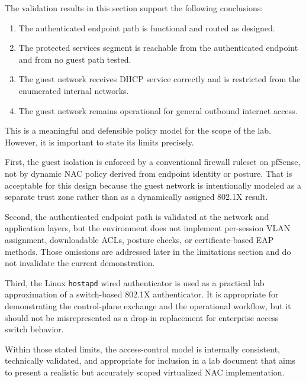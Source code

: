 \documentclass[11pt]{article}
\begin{document}
The validation results in this section support the following conclusions:

\begin{enumerate}
    \item The authenticated endpoint path is functional and routed as designed.
    \item The protected services segment is reachable from the authenticated endpoint and from no guest path tested.
    \item The guest network receives DHCP service correctly and is restricted from the enumerated internal networks.
    \item The guest network remains operational for general outbound internet access.
\end{enumerate}

This is a meaningful and defensible policy model for the scope of the lab. However, it is important to state its limits precisely.

First, the guest isolation is enforced by a conventional firewall ruleset on pfSense, not by dynamic NAC policy derived from endpoint identity or posture. That is acceptable for this design because the guest network is intentionally modeled as a separate trust zone rather than as a dynamically assigned 802.1X result.

Second, the authenticated endpoint path is validated at the network and application layers, but the environment does not implement per-session VLAN assignment, downloadable ACLs, posture checks, or certificate-based EAP methods. Those omissions are addressed later in the limitations section and do not invalidate the current demonstration.

Third, the Linux \texttt{hostapd} wired authenticator is used as a practical lab approximation of a switch-based 802.1X authenticator. It is appropriate for demonstrating the control-plane exchange and the operational workflow, but it should not be misrepresented as a drop-in replacement for enterprise access switch behavior.

Within those stated limits, the access-control model is internally consistent, technically validated, and appropriate for inclusion in a lab document that aims to present a realistic but accurately scoped virtualized NAC implementation.

\end{document}
